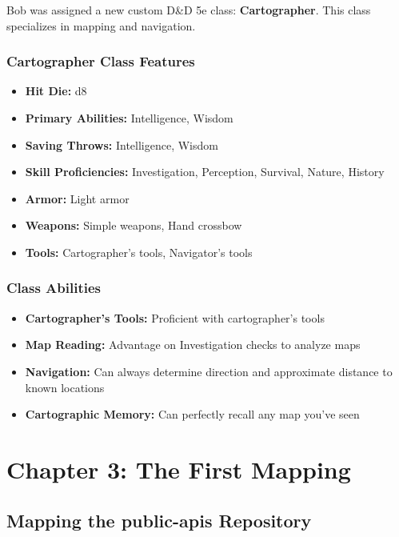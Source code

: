 \documentclass[11pt,letterpaper]{article}
\begin{document}
Bob was assigned a new custom D\&D 5e class: \textbf{Cartographer}. This class specializes in mapping and navigation.

\begin{highlightbox}
\subsubsection*{Cartographer Class Features}
\begin{itemize}[leftmargin=*]
    \item \textbf{Hit Die:} d8
    \item \textbf{Primary Abilities:} Intelligence, Wisdom
    \item \textbf{Saving Throws:} Intelligence, Wisdom
    \item \textbf{Skill Proficiencies:} Investigation, Perception, Survival, Nature, History
    \item \textbf{Armor:} Light armor
    \item \textbf{Weapons:} Simple weapons, Hand crossbow
    \item \textbf{Tools:} Cartographer's tools, Navigator's tools
\end{itemize}
\end{highlightbox}

\subsubsection{Class Abilities}
\begin{itemize}[leftmargin=*]
    \item \textbf{Cartographer's Tools:} Proficient with cartographer's tools
    \item \textbf{Map Reading:} Advantage on Investigation checks to analyze maps
    \item \textbf{Navigation:} Can always determine direction and approximate distance to known locations
    \item \textbf{Cartographic Memory:} Can perfectly recall any map you've seen
\end{itemize}

\section{Chapter 3: The First Mapping}

\subsection{Mapping the public-apis Repository}
\end{document}
